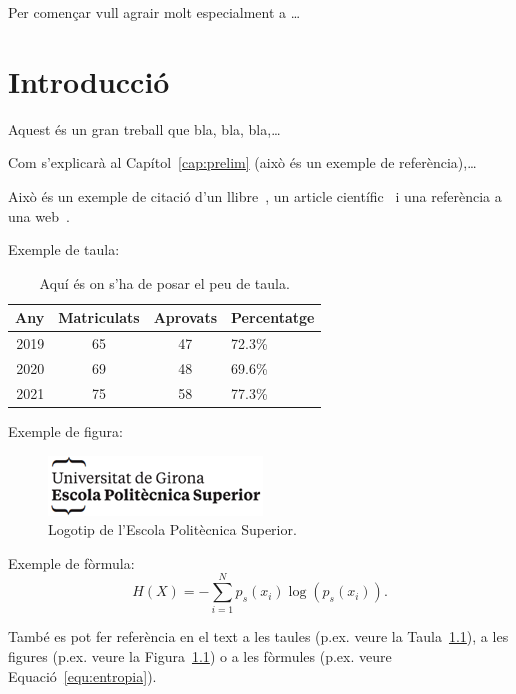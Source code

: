 \documentclass[a4paper,12pt,twoside]{ThesisStyle}
\begin{document}
Per començar vull agrair molt especialment a \ldots


\tableofcontents

\listoffigures

\listoftables

\mainmatter

\chapter{Introducció}
\label{cap:intro}

Aquest és un gran treball que bla, bla, bla,\ldots

Com s'explicarà al Capítol~\ref{cap:prelim} (això és un exemple de referència),\ldots

Això és un exemple de citació d'un llibre~\cite{Coleman1974}, un article científic~\cite{Ruiz2008} i una referència a una web~\cite{Halcon}.

Exemple de taula:
\begin{table}[htb]
  \centering
  \begin{tabular}{ | r | c | c | l | }
    \hline
    Any  & Matriculats & Aprovats & Percentatge \\
    \hline
    2019 & 65          & 47       & 72.3\%      \\
    2020 & 69          & 48       & 69.6\%      \\
    2021 & 75          & 58       & 77.3\%      \\
    \hline
  \end{tabular}
  \caption{Aquí és on s'ha de posar el peu de taula.}
  \label{taula:taulaexemple}
\end{table}

Exemple de figura:
\begin{figure}[htb]
  \centering
  \includegraphics[width=8 cm]{imatges/logo_eps.png}
  \caption{\label{fig:logo} Logotip de l'Escola Politècnica Superior.}
\end{figure}

Exemple de fòrmula:
\begin{equation}
  H(X) = -\sum_{i=1}^{N}p_s(x_i) \log \left( p_s(x_i) \right).
  \label{equ:entropia}
\end{equation}


També es pot fer referència en el text a les taules (p.ex. veure la Taula~\ref{taula:taulaexemple}), a les figures (p.ex. veure la Figura~\ref{fig:logo}) o a les fòrmules (p.ex. veure Equació~\ref{equ:entropia}).
\end{document}
